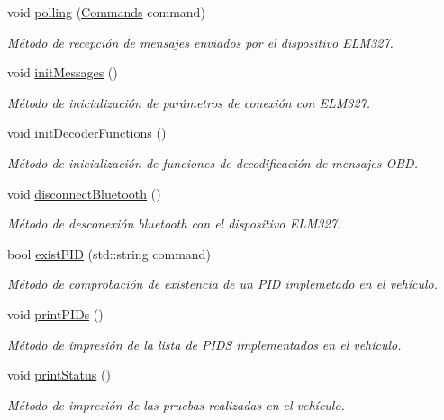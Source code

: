 \begin{DoxyCompactItemize}
void \hyperlink{classObd_a0792ecb9247f32760269fdf64a178f8f}{polling} (\hyperlink{classCommands}{Commands} command)
\begin{DoxyCompactList}\small\item\em Método de recepción de mensajes enviados por el dispositivo E\+L\+M327. \end{DoxyCompactList}\item 
void \hyperlink{classObd_a5091314ed8068800cce40e7a74a3731e}{init\+Messages} ()
\begin{DoxyCompactList}\small\item\em Método de inicialización de parámetros de conexión con E\+L\+M327. \end{DoxyCompactList}\item 
void \hyperlink{classObd_a560631b2e3af0a72c063f915a11e0466}{init\+Decoder\+Functions} ()
\begin{DoxyCompactList}\small\item\em Método de inicialización de funciones de decodificación de mensajes O\+BD. \end{DoxyCompactList}\item 
void \hyperlink{classObd_a95d02f8f3c48557c5ad799ecb6dd7f79}{disconnect\+Bluetooth} ()
\begin{DoxyCompactList}\small\item\em Método de desconexión bluetooth con el dispositivo E\+L\+M327. \end{DoxyCompactList}\item 
bool \hyperlink{classObd_aeff55ecb0a0a4278a22f20db3d2e17e3}{exist\+P\+ID} (std\+::string command)
\begin{DoxyCompactList}\small\item\em Método de comprobación de existencia de un P\+ID implemetado en el vehículo. \end{DoxyCompactList}\item 
void \hyperlink{classObd_abf7e84f45236ea1c78c762ac895c532c}{print\+P\+I\+Ds} ()
\begin{DoxyCompactList}\small\item\em Método de impresión de la lista de P\+I\+DS implementados en el vehículo. \end{DoxyCompactList}\item 
void \hyperlink{classObd_a0938bfdd6d05795e826a239cc0f29f32}{print\+Status} ()
\begin{DoxyCompactList}\small\item\em Método de impresión de las pruebas realizadas en el vehículo. \end{DoxyCompactList}\item 

\end{DoxyCompactItemize}
